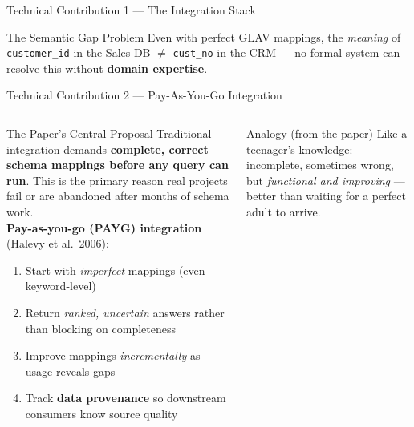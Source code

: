 \documentclass[aspectratio=169,10pt]{beamer}
\begin{document}
\begin{frame}{Technical Contribution 1 — The Integration Stack}
    \begin{alertblock}{The Semantic Gap Problem}
        Even with perfect GLAV mappings, the \emph{meaning} of
        \texttt{customer\_id} in the Sales DB $\neq$
        \texttt{cust\_no} in the CRM — no formal system can resolve
        this without \textbf{domain expertise}.
      \end{alertblock}
\end{frame}
\begin{frame}{Technical Contribution 2 — Pay-As-You-Go Integration}
  \begin{columns}[T]
      \begin{block}{The Paper's Central Proposal}
        Traditional integration demands \textbf{complete, correct schema
        mappings before any query can run}.
        This is the primary reason real projects fail or are abandoned
        after months of schema work.\\[5pt]
        \textbf{Pay-as-you-go (PAYG) integration} (Halevy et al.\ 2006):
        \begin{enumerate}
          \item Start with \emph{imperfect} mappings (even keyword-level)
          \item Return \emph{ranked, uncertain} answers rather than blocking on completeness
          \item Improve mappings \emph{incrementally} as usage reveals gaps
          \item Track \textbf{data provenance} so downstream consumers know source quality
        \end{enumerate}
      \end{block}
      \vspace{5pt}
      \begin{exampleblock}{Analogy (from the paper)}
        Like a teenager's knowledge: incomplete, sometimes wrong, but
        \emph{functional and improving} — better than waiting for
        a perfect adult to arrive.
      \end{exampleblock}


\end{columns}
\end{frame}
\end{document}
